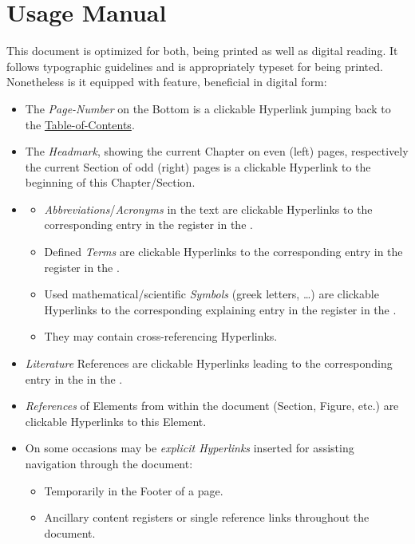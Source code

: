 \section{Usage Manual}

This document is optimized for both, being printed as well as digital reading.
It follows typographic guidelines and is appropriately typeset for being printed.
Nonetheless is it equipped with feature, beneficial in digital form:

\begin{itemize}
    \item
The \textit{Page-Number} on the Bottom is a clickable Hyperlink jumping back to the \hyperref[chapnt:ToC]{Table-of-Contents}.
    \item
The \textit{Headmark}, showing the current Chapter on even (left) pages, respectively the current Section of odd (right) pages is a clickable Hyperlink to the beginning of this Chapter/Section.
    \item
\hyperref[chap:Glossary]{}
    \begin{itemize}
        \item
    \textit{Abbreviations}/\textit{Acronyms} in the text are clickable Hyperlinks to the corresponding entry in the \hyperref[sec:Acronyms]{} register in the .
        \item
    Defined \textit{Terms} are clickable Hyperlinks to the corresponding entry in the \hyperref[sec:Glossaries]{} register in the .
        \item
    Used mathematical/scientific \textit{Symbols} (greek letters, \ldots) are clickable Hyperlinks to the corresponding explaining entry in the \hyperref[sec:Symbols]{} register in the .
        \item
    They may contain cross-referencing Hyperlinks.
    \end{itemize}
    \item
\textit{Literature} References are clickable Hyperlinks leading to the corresponding entry in the \hyperref[chap:literature]{} in the .
    \item
\textit{References} of Elements from within the document (Section, Figure, etc.) are clickable Hyperlinks to this Element.
    \item
On some occasions may be \textit{explicit Hyperlinks} inserted for assisting navigation through the document:
    \begin{itemize}
        \item
    Temporarily in the Footer of a page.
        \item
    Ancillary content registers or single reference links throughout the document.
    \end{itemize}
\end{itemize}

